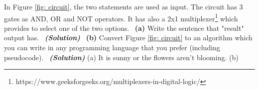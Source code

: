 \documentclass[a4 paper]{article}
\numberwithin{equation}{section}
\newcommand{\subproblem}[1]{~\newline\textbf{(#1)}}
\newcommand{\solution}{~\newline\textbf{\textit{(Solution)}} }
\newcommand{\0}{\mathbf{0}}
\begin{document}
In Figure \ref{fig: circuit}, the two statements are used as input. The circuit has 3 gates as AND, OR and NOT operators. It has also a 2x1 multiplexer\footnote{https://www.geeksforgeeks.org/multiplexers-in-digital-logic/} which provides to select one of the two options. 
\subproblem{a} Write the sentence that "result" output has.
\solution
\newline
\subproblem{b} Convert Figure \ref{fig: circuit} to an algorithm which you can write in any programming language that you prefer (including pseudocode).
\newpage
\solution
\newline
\newline
{(a) It is sunny or the flowers aren't blooming. }
\newline
\newline
\newline
\newline
\newline
\newline
{(b)} 
\end{document}
